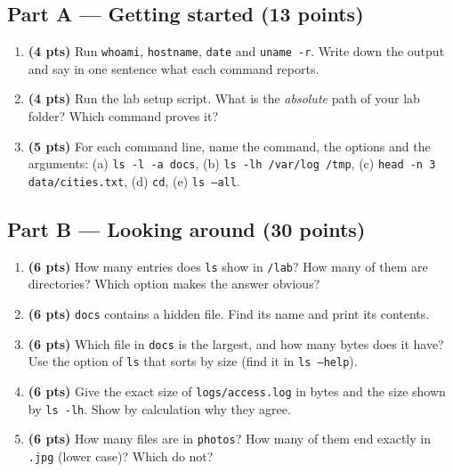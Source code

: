 \documentclass[11pt,a4paper]{article}
\newcommand{\cmd}[1]{\texttt{#1}}
\begin{document}
\subsection*{Part A --- Getting started (13 points)}
\begin{enumerate}[label=\textbf{A\arabic*}, leftmargin=2.2em]
  \item \textbf{(4 pts)} Run \cmd{whoami}, \cmd{hostname}, \cmd{date} and \cmd{uname -r}. Write down the output and say in one sentence what each command reports.
  \item \textbf{(4 pts)} Run the lab setup script. What is the \emph{absolute} path of your lab folder? Which command proves it?
  \item \textbf{(5 pts)} For each command line, name the command, the options and the arguments: (a) \cmd{ls -l -a docs}, (b) \cmd{ls -lh /var/log /tmp}, (c) \cmd{head -n 3 data/cities.txt}, (d) \cmd{cd}, (e) \cmd{ls --all}.
\end{enumerate}

\subsection*{Part B --- Looking around (30 points)}
\begin{enumerate}[label=\textbf{B\arabic*}, leftmargin=2.2em, start=4]
  \item \textbf{(6 pts)} How many entries does \cmd{ls} show in \texttt{\tl/lab}? How many of them are directories? Which option makes the answer obvious?
  \item \textbf{(6 pts)} \texttt{docs} contains a hidden file. Find its name and print its contents.
  \item \textbf{(6 pts)} Which file in \texttt{docs} is the largest, and how many bytes does it have? Use the option of \cmd{ls} that sorts by size (find it in \cmd{ls --help}).
  \item \textbf{(6 pts)} Give the exact size of \texttt{logs/access.log} in bytes and the size shown by \cmd{ls -lh}. Show by calculation why they agree.
  \item \textbf{(6 pts)} How many files are in \texttt{photos}? How many of them end exactly in \texttt{.jpg} (lower case)? Which do not?
\end{enumerate}
\end{document}
